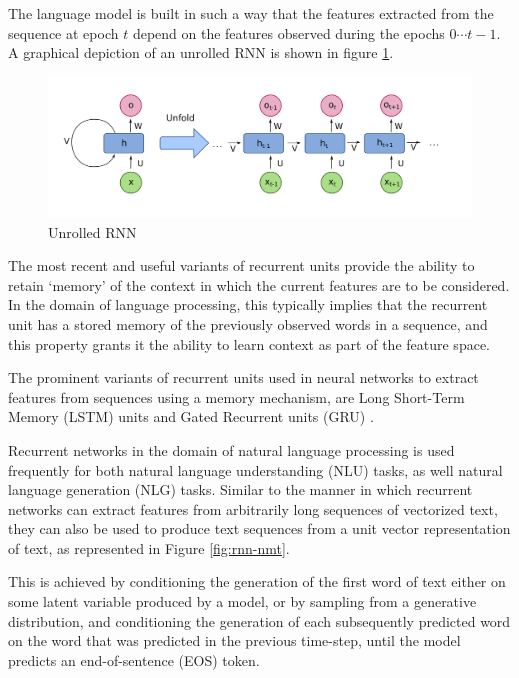 The language model is built in such a way that the features extracted from the sequence at epoch $t$ depend on the features observed during the epochs $0 \cdots t-1$. A graphical depiction of an unrolled RNN is shown in figure \ref{fig:recurrent-neural-network-unfold}.

\begin{figure}[ht]
	\centering
	\includegraphics[width=\textwidth]{images/recurrent-neural-network-unfold}
	\caption{\label{fig:recurrent-neural-network-unfold} Unrolled RNN}
\end{figure}

The most recent and useful variants of recurrent units provide the ability to retain `memory' of the context in which the current features are to be considered. In the domain of language processing, this typically implies that the recurrent unit has a stored memory of the previously observed words in a sequence, and this property grants it the ability to learn context as part of the feature space.

The prominent variants of recurrent units used in neural networks to extract features from sequences using a memory mechanism, are Long Short-Term Memory (LSTM) units \citep{gers2001lstm} and Gated Recurrent units (GRU) \citep{chung2014empirical}.

Recurrent networks in the domain of natural language processing is used frequently for both natural language understanding (NLU) tasks, as well natural language generation (NLG) tasks. Similar to the manner in which recurrent networks can extract features from arbitrarily long sequences of vectorized text, they can also be used to produce text sequences from a unit vector representation of text, as represented in Figure \ref{fig:rnn-nmt}.

This is achieved by conditioning the generation of the first word of text either on some latent variable produced by a model, or by sampling from a generative distribution, and conditioning the generation of each subsequently predicted word on the word that was predicted in the previous time-step, until the model predicts an end-of-sentence (EOS) token.

